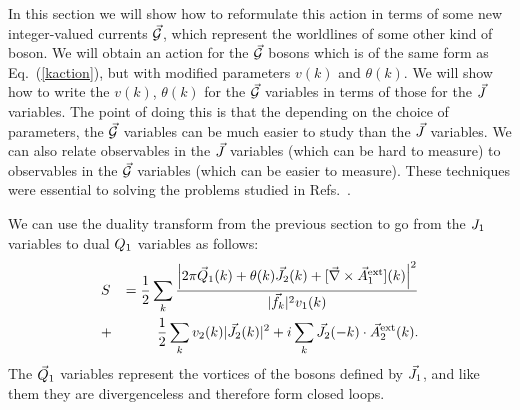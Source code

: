 In this section we will show how to reformulate this action in terms of some new integer-valued currents $\vec{\mathcal{G}}$, which represent the worldlines of some other kind of boson. We will obtain an action for the $\vec{\mathcal{G}}$ bosons which is of the same form as Eq.~(\ref{kaction}), but with modified parameters $v(k)$ and $\theta(k)$. We will show how to write the $v(k)$, $\theta(k)$ for the $\vec{\mathcal{G}}$ variables in terms of those for the $\vec{J}$ variables. The point of doing this is that the depending on the choice of parameters, the $\vec{\mathcal{G}}$ variables can be much easier to study than the $\vec{J}$ variables. We can also relate observables in the $\vec{J}$ variables (which can be hard to measure) to observables in the $\vec{\mathcal{G}}$ variables (which can be easier to measure). These techniques were essential to solving the problems studied in Refs.~\cite{short_range3,Gen2Loops,FQHE}.

We can use the duality transform from the previous section to go from the $J_1$ variables to dual $Q_1$ variables as follows:
\begin{eqnarray}
&S&=\frac{1}{2}\sum_k \frac{\left|2\pi\vec{Q}_1(k)+\theta(k)\vec{J}_2(k)+[\vec{\nabla}\times\vec{A}_{1}^{\rm ext}](k)\right|^2}{|\vec{f}_k|^2v_1(k)}\nonumber\\
&+&\frac{1}{2}\sum_k v_2(k)|\vec{J}_2(k)|^2 + i \sum_k \vec{J}_2(-k) \cdot \vec{A}_{2}^{\rm ext}(k).
\label{JQ1}
\end{eqnarray}
The $\vec{Q}_1$ variables represent the vortices of the bosons defined by $\vec{J}_1$, and like them they are divergenceless and therefore form closed loops.

